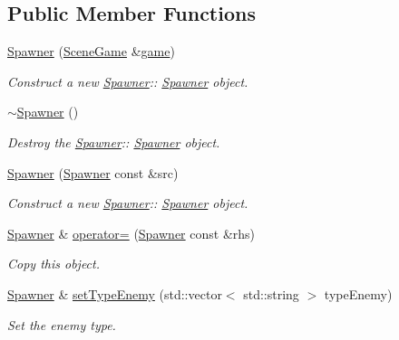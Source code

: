 \subsection*{Public Member Functions}
\begin{DoxyCompactItemize}
\item 
\hyperlink{class_spawner_a4272f1d8524f6ea13c576d63b2284069}{Spawner} (\hyperlink{class_scene_game}{Scene\+Game} \&\hyperlink{class_a_entity_aa2c05db944a8b7487eb8470dd20211ab}{game})
\begin{DoxyCompactList}\small\item\em Construct a new \hyperlink{class_spawner}{Spawner}\+:\+: \hyperlink{class_spawner}{Spawner} object. \end{DoxyCompactList}\item 
\mbox{\label{class_spawner_a59d8e3d4d6dc6c25f38ce5d4fcc5e8e6}} 
\hyperlink{class_spawner_a59d8e3d4d6dc6c25f38ce5d4fcc5e8e6}{$\sim$\+Spawner} ()
\begin{DoxyCompactList}\small\item\em Destroy the \hyperlink{class_spawner}{Spawner}\+:\+: \hyperlink{class_spawner}{Spawner} object. \end{DoxyCompactList}\item 
\hyperlink{class_spawner_a5e8a4444dd7d67a0cbafeb361cae9e77}{Spawner} (\hyperlink{class_spawner}{Spawner} const \&src)
\begin{DoxyCompactList}\small\item\em Construct a new \hyperlink{class_spawner}{Spawner}\+:\+: \hyperlink{class_spawner}{Spawner} object. \end{DoxyCompactList}\item 
\hyperlink{class_spawner}{Spawner} \& \hyperlink{class_spawner_aa0930e4611747bff692f0feb2bf06a01}{operator=} (\hyperlink{class_spawner}{Spawner} const \&rhs)
\begin{DoxyCompactList}\small\item\em Copy this object. \end{DoxyCompactList}\item 
\hyperlink{class_spawner}{Spawner} \& \hyperlink{class_spawner_a483e98b9d3c20f59332feb500ceb6199}{set\+Type\+Enemy} (std\+::vector$<$ std\+::string $>$ type\+Enemy)
\begin{DoxyCompactList}\small\item\em Set the enemy type. \end{DoxyCompactList}\item 

\end{DoxyCompactItemize}
